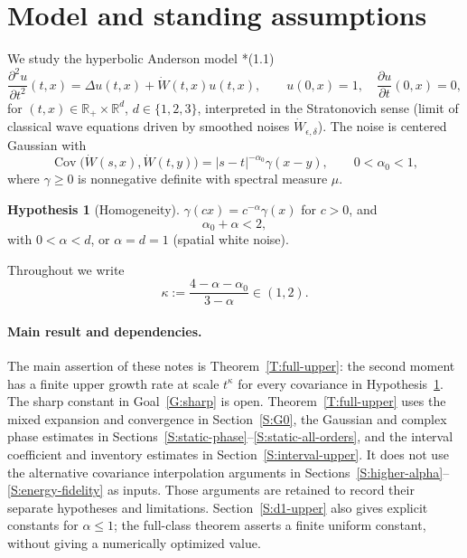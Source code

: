 \documentclass[12pt]{article}
\numberwithin{equation}{section}
\theoremstyle{definition}
\newtheorem{hypothesis}[theorem]{Hypothesis}
\newcommand{\R}{\mathbb{R}}
\newcommand{\W}{\dot W}
\begin{document}
\tableofcontents

\section{Model and standing assumptions}\label{S:model}

We study the hyperbolic Anderson model
\cite{chen:author2026:time-dependency}*{(1.1)}
\begin{equation}\label{E:HAM}
  \frac{\partial^2 u}{\partial t^2}(t,x)=\Delta u(t,x)+\W(t,x)u(t,x),
  \qquad u(0,x)=1,\quad \frac{\partial u}{\partial t}(0,x)=0,
\end{equation}
for $(t,x)\in\R_+\times\R^d$, $d\in\{1,2,3\}$, interpreted in the
Stratonovich sense (limit of classical wave equations driven by smoothed
noises $\W_{\epsilon,\delta}$). The noise is centered Gaussian with
\begin{equation}\label{E:cov}
  \operatorname{Cov}\big(\W(s,x),\W(t,y)\big)=|s-t|^{-\alpha_0}\gamma(x-y),
  \qquad 0<\alpha_0<1,
\end{equation}
where $\gamma\ge0$ is nonnegative definite with spectral measure $\mu$.

\begin{hypothesis}[Homogeneity]\label{H:homog}
  $\gamma(cx)=c^{-\alpha}\gamma(x)$ for $c>0$, and
  \begin{equation}\label{E:threshold}
    \alpha_0+\alpha<2,
  \end{equation}
  with $0<\alpha<d$, or $\alpha=d=1$ (spatial white noise).
\end{hypothesis}

Throughout we write
\begin{equation}\label{E:kappa}
  \kappa:=\frac{4-\alpha-\alpha_0}{3-\alpha}\in(1,2).
\end{equation}

\paragraph{Main result and dependencies.}
The main assertion of these notes is Theorem~\ref{T:full-upper}: the
second moment has a finite upper growth rate at scale $t^\kappa$ for
every covariance in Hypothesis~\ref{H:homog}. The sharp constant in
Goal~\ref{G:sharp} is open. Theorem~\ref{T:full-upper} uses the mixed
expansion and convergence in Section~\ref{S:G0}, the Gaussian and complex
phase estimates in Sections~\ref{S:static-phase}--\ref{S:static-all-orders},
and the interval coefficient and inventory estimates in
Section~\ref{S:interval-upper}. It does not use the alternative covariance
interpolation arguments in Sections~\ref{S:higher-alpha}--\ref{S:energy-fidelity}
as inputs. Those arguments are retained to record their separate hypotheses
and limitations. Section~\ref{S:d1-upper} also gives explicit constants for
$\alpha\le1$; the full-class theorem asserts a finite uniform constant,
without giving a numerically optimized value.
\end{document}
